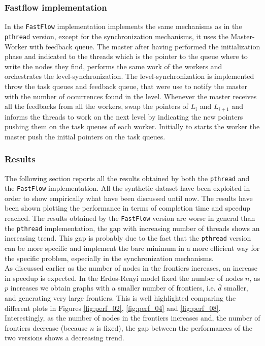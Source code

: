 \subsubsection{Fastflow implementation}
In the \texttt{FastFlow} implementation implements the same mechanisms as in the \texttt{pthread} version, except for the synchronization mechanisms, it uses the Master-Worker with feedback queue. The master after having performed the initialization phase and indicated to the threads which is the pointer to the queue where to write the nodes they find, performs the same work of the workers and orchestrates the level-synchronization. The level-synchronization is implemented throw the task queues and feedback queue, that were use to notify the master with the number of occurrences found in the level. Whenever the master receives all the feedbacks from all the workers, swap the pointers of $L_i$ and $L_{i+1}$ and informs the threads to work on the next level by indicating the new pointers pushing them on the task queues of each worker. Initially to starts the worker the master push the initial pointers on the task queues.
\subsubsection{Results}
The following section reports all the results obtained by both the \texttt{pthread} and the \texttt{FastFlow} implementation. All the synthetic dataset have been exploited in order to show empirically what have been discussed until now. The results have been shown plotting the performance in terms of completion time and speedup reached. The results obtained by the 
\texttt{FastFlow} version are worse in general than the \texttt{pthread} implementation, the gap with increasing number of threads shows an increasing trend. This gap is probably due to the fact that the \texttt{pthread} version can be more specific and implement the bare minimum in a more efficient way for the specific problem, especially in the synchronization mechanisms. 
\\
As discussed earlier as the number of nodes in the frontiers increases, an increase in speedup is expected. In the Erdos-Renyi model fixed the number of nodes $n$, as $p$ increases we obtain graphs with a smaller number of frontiers, i.e. $\bar{d}$ smaller, and generating very large frontiers. This is well highlighted comparing the different plots in Figures
\ref{fig:perf_02}, \ref{fig:perf_04} and \ref{fig:perf_08}. Interestingly, as the number of nodes in the frontiers increases and, the number of frontiers decrease (because $n$ is fixed), the gap between the performances of the two versions shows a decreasing trend.

